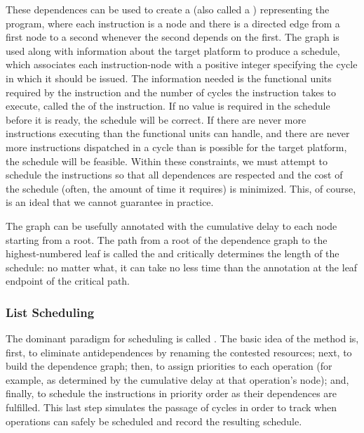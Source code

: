 These dependences can be used to create a  (also called a ) representing the program, where each instruction is a node and there is a directed edge from a first node to a second whenever the second depends on the first. The graph is used along with information about the target platform to produce a schedule, which associates each instruction-node with a positive integer specifying the cycle in which it should be issued. The information needed is the functional units required by the instruction and the number of cycles the instruction takes to execute, called the  of the instruction. If no value is required in the schedule before it is ready, the schedule will be correct. If there are never more instructions executing than the functional units can handle, and there are never more instructions dispatched in a cycle than is possible for the target platform, the schedule will be feasible. Within these constraints, we must attempt to schedule the instructions so that all dependences are respected and the cost of the schedule (often, the amount of time it requires) is minimized. This, of course, is an ideal that we cannot guarantee in practice.

The graph can be usefully annotated with the cumulative delay to each node starting from a root. The path from a root of the dependence graph to the highest-numbered leaf is called the  and critically determines the length of the schedule: no matter what, it can take no less time than the annotation at the leaf endpoint of the critical path.

\subsubsection{List Scheduling}
The dominant paradigm for scheduling is called . The basic idea of the method is, first, to eliminate antidependences by renaming the contested resources; next, to build the dependence graph; then, to assign priorities to each operation (for example, as determined by the cumulative delay at that operation's node); and, finally, to schedule the instructions in priority order as their dependences are fulfilled. This last step simulates the passage of cycles in order to track when operations can safely be scheduled and record the resulting schedule.

